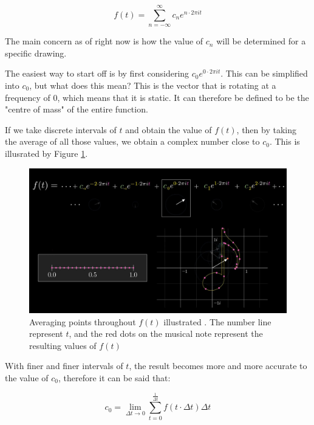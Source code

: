 \documentclass[letterpaper, 12pt]{article}
\begin{document}
\begin{equation}
    f(t) = \sum_{n=-\infty}^{\infty} c_n e^{n \cdot 2\pi it}
    \label{eq:ft_def}
\end{equation}

The main concern as of right now is how the value of \(c_n\) will be determined
for a specific drawing.

The easiest way to start off is by first considering \(c_0 e^{0 \cdot 2\pi it}\).
This can be simplified into \(c_0\), but what does this mean?
This is the vector that is rotating at a frequency of 0, which means that
it is static. It can therefore be defined to be the "centre of mass"\cite{sandersonWhatFourierSeries2019}
of the entire function.

If we take discrete intervals of \(t\) and obtain the value of \(f(t)\),
then by taking the average of all those values, we obtain a complex number
close to \(c_0\). This is illusrated by Figure \ref{fig:cnot_integ}.

\begin{figure}[H]
    \centering
    \includegraphics[width=\textwidth]{cnot_integ.jpeg}
    \caption{Averaging points throughout \protect\(f(t)\) illustrated \protect\cite{sandersonWhatFourierSeries2019}. The number line represent \protect\(t\), and the red dots on the musical note represent the resulting values of \protect\(f(t)\)}
    \label{fig:cnot_integ}
\end{figure}

With finer and finer intervals of \(t\), the result
becomes more and more accurate to the value of \(c_0\), therefore it can be
said that:

\begin{equation}
    c_0 = \lim_{\Delta t \to 0} \sum_{t = 0}^{\frac{1}{\Delta t}} f(t \cdot \Delta t) \Delta t
    \label{eq:cnot_lim}
\end{equation}
\end{document}
